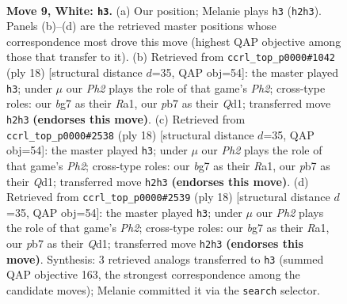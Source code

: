 \documentclass[11pt]{article}
\begin{document}
\clearpage

\begin{figure}[p]\centering
\begin{subfigure}{0.46\textwidth}\centering
\resizebox{\linewidth}{!}{%
\newchessgame
\chessboard[
  setfen={r1bq1rk1/ppp2pbp/2np1np1/8/2PNP3/2N5/PP2BPPP/R1BQ1RK1 w - - 1 9},
  showmover=false,
  pgfstyle=straightmove, color=movearrow, markmove={h2-h3}
]}
\caption{}
\end{subfigure}\hfill
\begin{subfigure}{0.46\textwidth}\centering
\resizebox{\linewidth}{!}{%
\newchessgame
\chessboard[
  setfen={r1bq1rk1/1p2ppbp/p1np1np1/8/2PNP3/2N1B3/PP2BPPP/R2Q1RK1 w - - 0 10},
  showmover=false,
  pgfstyle=straightmove, color=movearrow, markmove={h2-h3}
]}
\caption{}
\end{subfigure}
\\[4pt]
\begin{subfigure}{0.46\textwidth}\centering
\resizebox{\linewidth}{!}{%
\newchessgame
\chessboard[
  setfen={r1bq1rk1/1p2ppbp/p1np1np1/8/2PNP3/2N1B3/PP2BPPP/R2Q1RK1 w - - 0 10},
  showmover=false,
  pgfstyle=straightmove, color=movearrow, markmove={h2-h3}
]}
\caption{}
\end{subfigure}\hfill
\begin{subfigure}{0.46\textwidth}\centering
\resizebox{\linewidth}{!}{%
\newchessgame
\chessboard[
  setfen={r1bq1rk1/1p2ppbp/p1np1np1/8/2PNP3/2N1B3/PP2BPPP/R2Q1RK1 w - - 0 10},
  showmover=false,
  pgfstyle=straightmove, color=movearrow, markmove={h2-h3}
]}
\caption{}
\end{subfigure}
\caption{\textbf{Move 9, White: \texttt{h3}.} (a) Our position; Melanie plays \texttt{h3} (\texttt{h2h3}). Panels (b)--(d) are the retrieved master positions whose correspondence most drove this move (highest QAP objective among those that transfer to it). (b) Retrieved from \texttt{ccrl\_top\_p0000\#1042} (ply 18) [structural distance $d$=35, QAP obj=54]: the master played \texttt{h3}; under $\mu$ our \emph{Ph2} plays the role of that game's \emph{Ph2}; cross-type roles: our \emph{b}g7 as their \emph{R}a1, our \emph{p}b7 as their \emph{Q}d1; transferred move \texttt{h2h3} \textbf{(endorses this move)}. (c) Retrieved from \texttt{ccrl\_top\_p0000\#2538} (ply 18) [structural distance $d$=35, QAP obj=54]: the master played \texttt{h3}; under $\mu$ our \emph{Ph2} plays the role of that game's \emph{Ph2}; cross-type roles: our \emph{b}g7 as their \emph{R}a1, our \emph{p}b7 as their \emph{Q}d1; transferred move \texttt{h2h3} \textbf{(endorses this move)}. (d) Retrieved from \texttt{ccrl\_top\_p0000\#2539} (ply 18) [structural distance $d$=35, QAP obj=54]: the master played \texttt{h3}; under $\mu$ our \emph{Ph2} plays the role of that game's \emph{Ph2}; cross-type roles: our \emph{b}g7 as their \emph{R}a1, our \emph{p}b7 as their \emph{Q}d1; transferred move \texttt{h2h3} \textbf{(endorses this move)}. Synthesis: 3 retrieved analogs transferred to \texttt{h3} (summed QAP objective 163, the strongest correspondence among the candidate moves); Melanie committed it via the \texttt{search} selector.}
\label{fig:thought-m16}
\end{figure}
\end{document}
